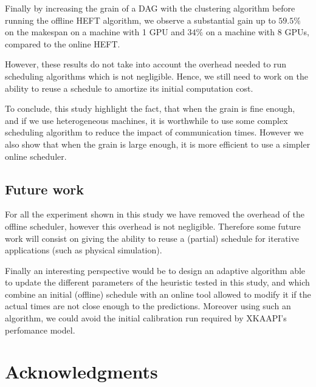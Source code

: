 \documentclass[10pt, conference, compsocconf,pdftex,dvipsnames]{IEEEtran}
\newcommand{\mytodo}[1]{\todo[inline]{#1}}
\begin{document}
Finally by increasing the grain of a DAG with the clustering algorithm before
running the offline HEFT algorithm, we observe a substantial gain up to $59.5\%$
on the makespan on a machine with 1 GPU and $34\%$ on a machine with 8 GPUs, 
compared to the online HEFT.

However, these results do not take into account the overhead needed to run
scheduling algorithms which is not negligible. Hence, we still need to work on
the ability to reuse a schedule to amortize its initial computation cost. 

To conclude, this study highlight the fact, that when the grain is fine
enough, and if we use heterogeneous machines, it is worthwhile to use some 
complex scheduling algorithm to reduce the impact of communication times.
However we also show that when the grain is large enough, it is more
efficient to use a simpler online scheduler.

\subsection{Future work}
\label{chap:cncl-work}

For all the experiment shown in this study we have removed the overhead of the
offline scheduler, however this overhead is not negligible. Therefore some
future work will consist on giving the ability to reuse a (partial) schedule
for iterative applications (such as physical simulation).


Finally an interesting perspective would be to design an adaptive algorithm
able to update the different parameters of the heuristic tested in this study,
and which combine an initial (offline) schedule with an online tool allowed to
modify it if the actual times are not close enough to the predictions. Moreover
using such an algorithm, we could avoid the initial calibration run required
by XKAAPI's perfomance model.

\mytodo{Remove the todo list}
\section*{Acknowledgments}
\end{document}
